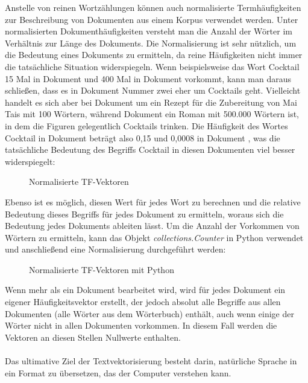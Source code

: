 Anstelle von reinen Wortzählungen können auch normalisierte Termhäufigkeiten zur Beschreibung von Dokumenten aus einem Korpus verwendet werden. 
Unter normalisierten Dokumenthäufigkeiten versteht man die Anzahl der Wörter im Verhältnis zur Länge des Dokuments. 
Die Normalisierung ist sehr nützlich, um die Bedeutung eines Dokuments zu ermitteln, da reine Häufigkeiten nicht immer die tatsächliche Situation widerspiegeln. 
Wenn beispielsweise das Wort \glqq Cocktail\grqq{} 15 Mal in Dokument  und 400 Mal in Dokument  vorkommt, kann man daraus schließen, dass es in Dokument Nummer zwei eher um Cocktails geht.
Vielleicht handelt es sich aber bei Dokument  um ein Rezept für die Zubereitung von Mai Tais mit 100 Wörtern, während Dokument  ein Roman mit 500.000 Wörtern ist, in dem die Figuren gelegentlich Cocktails trinken. 
Die Häufigkeit des Wortes \glqq Cocktail\grqq{} in Dokument  beträgt also 0,15 und 0,0008 in Dokument , was die tatsächliche Bedeutung des Begriffs \glqq Cocktail\grqq{} in diesen Dokumenten viel besser widerspiegelt:
\begin{figure}[H]
    \centering
    \caption{\label{figure:Norm_Vektoren}Normalisierte TF-Vektoren}
\end{figure}
\noindent
Ebenso ist es möglich, diesen Wert für jedes Wort zu berechnen und die relative Bedeutung dieses Begriffs für jedes Dokument zu ermitteln, woraus sich die Bedeutung jedes Dokuments ableiten lässt. 
Um die Anzahl der Vorkommen von Wörtern zu ermitteln, kann das Objekt \textit{collections.Counter} in Python verwendet und anschließend eine Normalisierung durchgeführt werden:
\begin{figure}[H]
    \centering
    \caption{\label{figure:Norm_Vektoren_Python}Normalisierte TF-Vektoren mit Python}
\end{figure}
\noindent
Wenn mehr als ein Dokument bearbeitet wird, wird für jedes Dokument ein eigener Häufigkeitsvektor erstellt, der jedoch absolut alle Begriffe aus allen Dokumenten (alle Wörter aus dem Wörterbuch) enthält, auch wenn einige der Wörter nicht in allen Dokumenten vorkommen. 
In diesem Fall werden die Vektoren an diesen Stellen Nullwerte enthalten.\\\\
Das ultimative Ziel der Textvektorisierung besteht darin, natürliche Sprache in ein Format zu übersetzen, das der Computer verstehen kann. 

